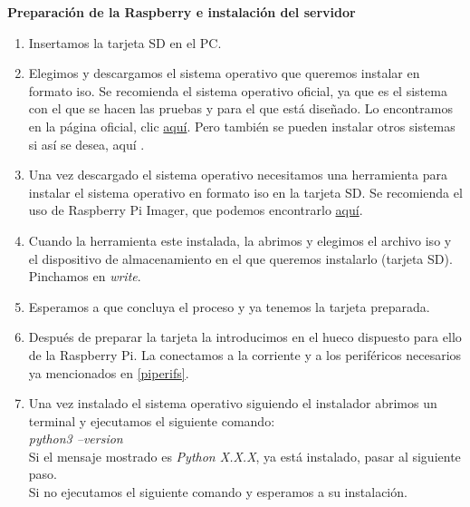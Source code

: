 \textbf{Preparación de la Raspberry e instalación del servidor}\\

\begin{enumerate}
\item
	Insertamos la tarjeta SD en el PC.
\item
	Elegimos y descargamos el sistema operativo que queremos instalar en formato iso.
	Se recomienda el sistema operativo oficial, ya que es el sistema con el que se hacen las pruebas y para el que está diseñado. Lo encontramos en la página oficial, clic \href{https://www.raspberrypi.org/software/operating-systems/#raspberry-pi-os-32-bit}{aquí}.
	Pero también se pueden instalar otros sistemas si así se desea, aquí \cite{pios}.
\item
	Una vez descargado el sistema operativo necesitamos una herramienta para instalar el sistema operativo en formato iso en la tarjeta SD.
	Se recomienda el uso de Raspberry Pi Imager, que podemos encontrarlo \href{https://www.raspberrypi.org/software/}{aquí}.
\item
	Cuando la herramienta este instalada, la abrimos y elegimos el archivo iso y el dispositivo de almacenamiento en el que queremos instalarlo (tarjeta SD).
	Pinchamos en \textit{write}.
\item
	Esperamos a que concluya el proceso y ya tenemos la tarjeta preparada.
\item
	Después de preparar la tarjeta la introducimos en el hueco dispuesto para ello de la Raspberry Pi. La conectamos a la corriente y a los periféricos necesarios ya mencionados en \ref{piperifs}.
\item
	Una vez instalado el sistema operativo siguiendo el instalador abrimos un terminal y ejecutamos el siguiente comando:\\
	\textit{python3 --version}\\
	Si el mensaje mostrado es \textit{Python X.X.X}, ya está instalado, pasar al siguiente paso.\\
	Si no ejecutamos el siguiente comando y esperamos a su instalación.
	

\end{enumerate}
